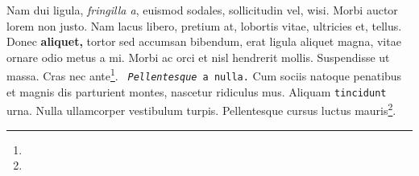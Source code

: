 \documentclass[cfonts]{nostarch}
\begin{document}
\lipsum[1]

Nam dui ligula, \emph{fringilla a}, euismod sodales, sollicitudin vel,
wisi.  Morbi auctor lorem non justo. Nam lacus libero, pretium at,
lobortis vitae, ultricies et, tellus. Donec \textbf{aliquet,} tortor
sed accumsan bibendum, erat ligula aliquet magna, vitae ornare odio
metus a mi.  Morbi ac orci et nisl hendrerit mollis.  Suspendisse ut
massa. Cras nec ante\footnote{\lipsum[4]}. \texttt{{\itshape
    Pellentesque} a nulla.}  Cum sociis natoque penatibus et magnis
dis parturient montes, nascetur ridiculus mus. Aliquam
\texttt{tincidunt} urna.  Nulla ullamcorper vestibulum turpis.
Pellentesque cursus luctus mauris\footnote{\lipsum[3]}.
\lipsum[10-15]
\end{document}
